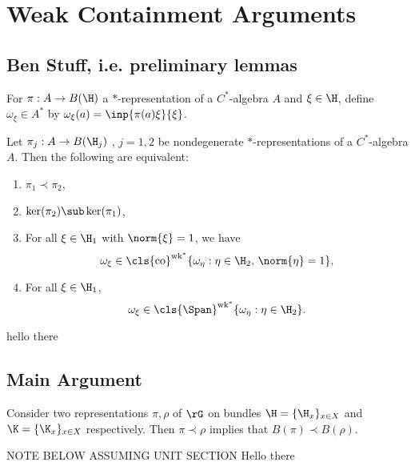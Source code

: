 \documentclass[../main.tex]{subfiles}
\begin{document}
\section{Weak Containment Arguments}


\subsection{Ben Stuff, i.e. preliminary lemmas}

For $ \pi:A\to B(\H) $ a $ * $-representation of a $ C^{*} $-algebra $ A $ and $ \xi\in \H $, define $ \omega_{\xi}\in A^{*} $ by $ \omega_{\xi}(a) = \inp{\pi(a) \xi}{\xi} $.

\begin{theorem}
    Let $ \pi_{j}:A\to B(\H_{j}) $ , $ j=1,2 $ be nondegenerate $ * $-representations of a $ C^{*} $-algebra $ A $. Then the following are equivalent:
    \begin{enumerate}
        \item $ \pi_{1}\prec \pi_{2} $,
        \item $ \ker(\pi_{2})\sub \ker(\pi_{1}) $,
        \item For all $ \xi\in \H_{1} $ with $ \norm{\xi} = 1 $, we have 
            \[
                \omega_{\xi}\in \cls{\text{co}}^{\text{wk}^{*}}\{ \omega_{\eta}: \eta\in \H_{2},\, \norm{\eta}=1\},
            \]
        \item For all $ \xi\in \H_{1} $,
            \[
                \omega_{\xi}\in \cls{\Span}^{\text{wk}^{*}}\{ \omega_{\eta}: \eta\in \H_{2}\}.
            \]
    \end{enumerate}

\end{theorem}
hello there


\subsection{Main Argument}

\begin{proposition}
    Consider two representations $ \pi, \rho$ of $ \rG $ on bundles $ \H = \{\H_{x}\}_{x\in X} $ and $ \K = \{\K_{x}\}_{x\in X} $ respectively. Then $ \pi \prec \rho $ implies that $ B(\pi) \prec B( \rho) $.
\end{proposition}

NOTE BELOW ASSUMING UNIT SECTION
Hello there
\end{document}
